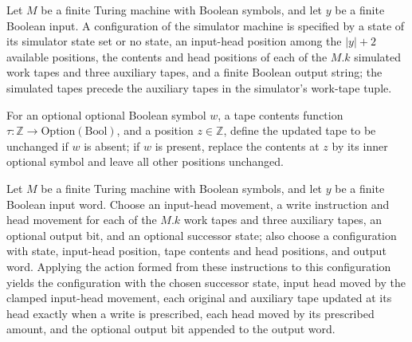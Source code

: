 \begin{definition}
\label{Complexity.Meyer.tcfg}
\leanok
{}
Let $M$ be a finite Turing machine with Boolean symbols, and let $y$ be a finite Boolean
input. A configuration of the simulator machine is specified by a state of its simulator
state set or no state, an input-head position among the $|y|+2$ available positions, the
contents and head positions of each of the $M.k$ simulated work tapes and three
auxiliary tapes, and a finite Boolean output string; the simulated tapes precede the
auxiliary tapes in the simulator's work-tape tuple.
\end{definition}

\begin{definition}
\label{Complexity.Meyer.wr}
\leanok
For an optional optional Boolean symbol $w$, a tape contents function
$\tau:\mathbb{Z}\to\mathrm{Option}(\mathrm{Bool})$, and a position $z\in\mathbb{Z}$,
define the updated tape to be unchanged if $w$ is absent; if $w$ is present, replace the
contents at $z$ by its inner optional symbol and leave all other positions unchanged.
\end{definition}

\begin{theorem}
\label{Complexity.Meyer.tact_apply}
\leanok
{}
Let $M$ be a finite Turing machine with Boolean symbols, and let $y$ be a finite Boolean
input word. Choose an input-head movement, a write instruction and head movement for
each of the $M.k$ work tapes and three auxiliary tapes, an optional output bit, and an
optional successor state; also choose a configuration with state, input-head position,
tape contents and head positions, and output word. Applying the action formed from these
instructions to this configuration yields the configuration with the chosen successor
state, input head moved by the clamped input-head movement, each original and auxiliary
tape updated at its head exactly when a write is prescribed, each head moved by its
prescribed amount, and the optional output bit appended to the output word.
\end{theorem}

